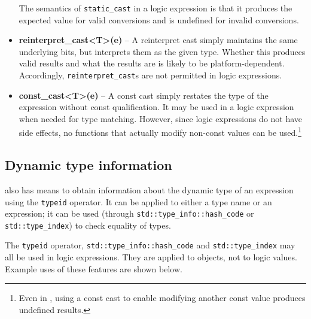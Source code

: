 \begin{itemize}
	The semantics of \lstinline|static_cast| in a logic expression is that it produces the expected value for valid conversions and is undefined for invalid conversions.
	
	\item \textbf{reinterpret\_cast<T>(e)} -- A reinterpret cast simply  maintains the same underlying bits, but interprets them as the given type. 
	Whether this produces valid results and what the results are is likely to be platform-dependent. 
	Accordingly, \lstinline|reinterpret_cast|s are not permitted in logic expressions.
	
	\item \textbf{const\_cast<T>(e)} -- A const cast simply restates the type of the expression without const qualification. 
	It may be used in a logic expression when needed for type matching. 
	However, since logic expressions do not have side effects, no functions that actually modify non-const values can be used.\footnote{Even in \lang, using a const cast to enable modifying another const value produces undefined results.}
	
\end{itemize}


\subsection{Dynamic type information}


\lang also has means to obtain information about the dynamic
type of an expression using the \lstinline|typeid| operator. It can be applied to either a type name or an expression; it can be used (through \lstinline|std::type_info::hash_code| or \lstinline|std::type_index|) to check equality of types.

The  \lstinline|typeid| operator, \lstinline|std::type_info::hash_code| and \lstinline|std::type_index| may all be used in logic expressions. They are
applied to \lang objects, not to logic values. Example uses of these features are
shown below.




